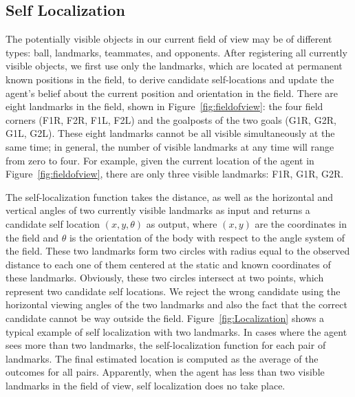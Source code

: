 \subsection{Self Localization} 

The potentially visible objects in our current field of view may be of different types: ball, landmarks, teammates, and opponents. After registering all currently visible objects, we first use only the landmarks, which are located at permanent known positions in the field, to derive candidate self-locations and update the agent's belief about the current position and orientation in the field. There are eight landmarks in the field, shown in Figure~\ref{fig:fieldofview}: the four field corners (F1R, F2R, F1L, F2L) and the goalposts of the two goals (G1R, G2R, G1L, G2L). These eight landmarks cannot be all visible simultaneously at the same time; in general, the number of visible landmarks at any time will range from zero to four. For example, given the current location of the agent in Figure~\ref{fig:fieldofview}, there are only three visible landmarks: F1R, G1R, G2R. 

The self-localization function takes the distance, as well as the horizontal and vertical angles of two currently visible landmarks as input and returns a candidate self location $(x,y,\theta)$ as output, where $(x,y)$ are the coordinates in the field and $\theta$ is the orientation of the body with respect to the angle system of the field. These two landmarks form two circles with radius equal to the observed distance to each one of them centered at the static and known coordinates of these landmarks. Obviously, these two circles intersect at two points, which represent two candidate self locations. We reject the wrong candidate using the horizontal viewing angles of the two landmarks and also the fact that the correct candidate cannot be way outside the field. Figure~\ref{fig:Localization} shows a typical example of self localization with two landmarks. In cases where the agent sees more than two landmarks, the self-localization function for each pair of landmarks. The final estimated location is computed as the average of the outcomes for all pairs. Apparently, when the agent has less than two visible landmarks in the field of view, self localization does no take place.   

